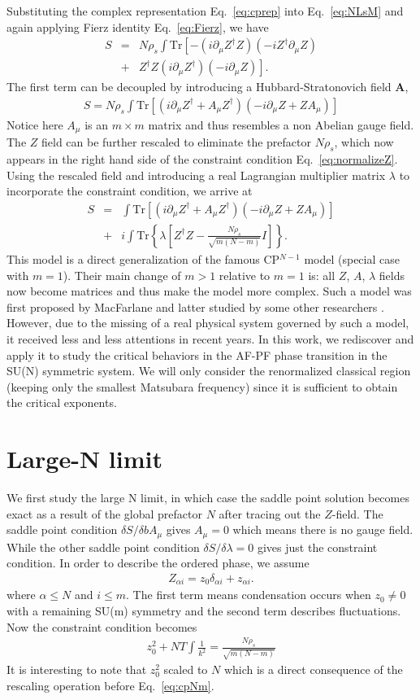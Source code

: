 \documentclass[aps,twocolumn,superscriptaddress]{revtex4-1}
\newcommand{\bea}{\begin{eqnarray}}
\newcommand{\eea}{\end{eqnarray}}
\newcommand{\bA}{\mathbf{A}}
\begin{document}
Substituting the complex representation Eq.~\ref{eq:cprep} into Eq.~\ref{eq:NLsM} and again applying Fierz identity Eq.~\ref{eq:Fierz}, we have
\bea S &=& N\rho_s \int\mathrm{Tr}\left[-(i\partial_\mu Z^\dagger Z) (-iZ^\dag \partial_\mu Z) \right. \nonumber\\  &+& \left. Z^\dag Z (i\partial_\mu Z^\dagger)(-i\partial_\mu Z)\right] .\eea
The first term can be decoupled by introducing a Hubbard-Stratonovich field $\bA$, 
\bea S=N\rho_s\int \mathrm{Tr}\left[ (i\partial_\mu Z^\dag+A_\mu Z^\dag)(-i\partial_\mu Z+ZA_\mu)  \right] \eea
Notice here $A_\mu$ is an $m\times m$ matrix and thus resembles a non Abelian gauge field.
The $Z$ field can be further rescaled to eliminate the prefactor $N\rho_s$, which now appears in the right hand side of the constraint condition Eq.~\ref{eq:normalizeZ}. Using the rescaled field and introducing a real Lagrangian multiplier matrix $\lambda$ to incorporate the constraint condition, we arrive at
\bea \label{eq:cpNm} S&=&\int \mathrm{Tr}\left[ (i\partial_\mu Z^\dag+A_\mu Z^\dag)(-i\partial_\mu Z+ZA_\mu)  \right] \nonumber \\ &+& i\int \mathrm{Tr}\left\{\lambda\left[Z^\dag Z-\frac{N\rho_s}{\sqrt{m(N-m)}}I\right]\right\} . \eea 
This model is a direct generalization of the famous CP$^{N-1}$ model \cite{} (special case with $m=1$). Their main change of $m>1$ relative to $m=1$ is: all $Z$, $A$, $\lambda$ fields now become matrices and thus make the model more complex. Such a model was first proposed by MacFarlane \cite{} and latter studied by some other researchers \cite{Hikomi, Duerksen, Read&Sachdev}. However, due to the missing of a real physical system governed by such a model, it received less and less attentions in recent years. In this work, we rediscover and apply it to study the critical behaviors in the AF-PF phase transition in the SU(N) symmetric system. We will only consider the renormalized classical region (keeping only the smallest Matsubara frequency) since it is sufficient to obtain the critical exponents. \cite{IKK}

\section{Large-N limit}
We first study the large N limit, in which case the saddle point solution becomes exact as a result of the global prefactor $N$ after tracing out the $Z$-field. The saddle point condition $\delta S/\delta bA_\mu$ gives $A_\mu=0$ which means there is no gauge field. While the other saddle point condition $\delta S/\delta \lambda=0$ gives just the constraint condition. In order to describe the ordered phase, we assume 
\bea Z_{\alpha i}=z_0\delta_{\alpha i}+z_{\alpha i}. \eea 
where $\alpha\le N$ and $i\le m$. The first term means condensation occurs when $z_0\ne0$ with a remaining SU(m) symmetry and the second term describes fluctuations. Now the constraint condition becomes
\bea z_0^2 + NT\int \frac{1}{k^2} = \frac{N\rho_s}{\sqrt{m(N-m)}} \eea
It is interesting to note that $z_0^2$ scaled to $N$ which is a direct consequence of the rescaling operation before Eq.~\ref{eq:cpNm}. 
\end{document}
